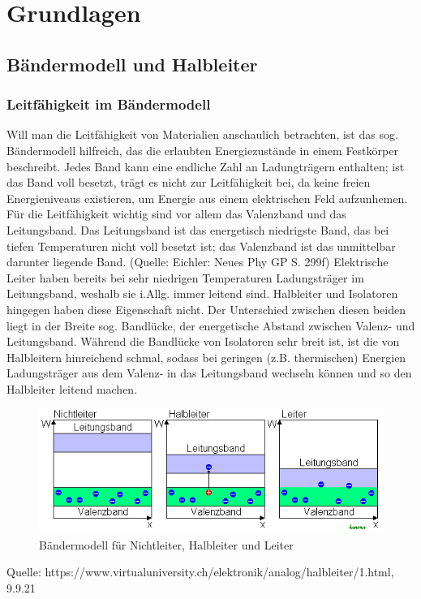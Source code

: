 
\section{Grundlagen}
\subsection{Bändermodell und Halbleiter}
\subsubsection{Leitfähigkeit im Bändermodell}
Will man die Leitfähigkeit von Materialien anschaulich betrachten, ist das sog. Bändermodell hilfreich, das die erlaubten Energiezustände in einem Festkörper beschreibt. Jedes Band kann eine endliche Zahl an Ladungträgern enthalten; ist das Band voll besetzt, trägt es nicht zur Leitfähigkeit bei, da keine freien Energieniveaus existieren, um Energie aus einem elektrischen Feld aufzunhemen. Für die Leitfähigkeit wichtig sind vor allem das Valenzband und das Leitungsband. Das Leitungsband ist das energetisch niedrigste Band, das bei tiefen Temperaturen nicht voll besetzt ist; das Valenzband ist das unmittelbar darunter liegende Band. (Quelle: Eichler: Neues Phy GP S. 299f)
Elektrische Leiter haben bereits bei sehr niedrigen Temperaturen Ladungsträger im Leitungsband, weshalb sie i.Allg. immer leitend sind. Halbleiter und Isolatoren hingegen haben diese Eigenschaft nicht. Der Unterschied zwischen diesen beiden liegt in der Breite sog. Bandlücke, der energetische Abstand zwischen Valenz- und Leitungsband. Während die Bandlücke von Isolatoren sehr breit ist, ist die von Halbleitern hinreichend schmal, sodass bei geringen (z.B. thermischen) Energien Ladungsträger aus dem Valenz- in das Leitungsband wechseln können und so den Halbleiter leitend machen. \\
\begin{figure}[h]
    \centering
    \includegraphics[scale=0.75]{Bilder/Baendermodell.png}
    \caption{Bändermodell für Nichtleiter, Halbleiter und Leiter}
\end{figure}
Quelle: https://www.virtualuniversity.ch/elektronik/analog/halbleiter/1.html, 9.9.21

